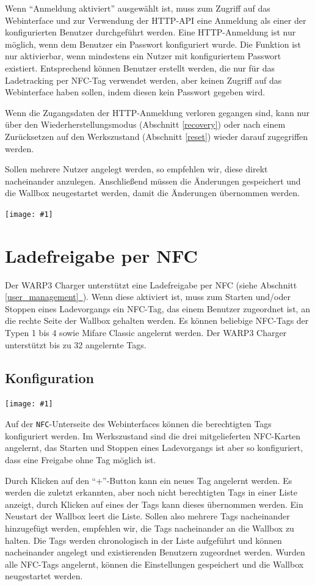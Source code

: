 \documentclass[a4paper,10pt]{article}
\newcommand{\hint}[1]{\begin{tcolorbox}[colback=boxgray,colframe=black,coltext=
white,title=Hinweis,left*=2mm,right*=2mm,boxsep=1mm,bottom=1mm,top=1mm]#1\end{tcolorbox}}
\newcommand{\gfx}[1]{\texttt{[image: \#1]}}
\newcommand*{\fullref}[1]{Abschnitt \hyperref[{#1}]{\ref*{#1}~\nameref*{#1}}}
\begin{document}
\begin{multicols*}{2}
    Wenn \enquote{Anmeldung aktiviert} ausgewählt ist, muss zum Zugriff auf das Webinterface und zur Verwendung
    der HTTP-API eine Anmeldung als einer der konfigurierten Benutzer durchgeführt werden. Eine HTTP-Anmeldung ist nur möglich, wenn
    dem Benutzer ein Passwort konfiguriert wurde. Die Funktion ist nur aktivierbar, wenn mindestens ein Nutzer mit konfiguriertem Passwort existiert. Entsprechend können Benutzer erstellt werden, die nur für das Ladetracking per NFC-Tag
    verwendet werden, aber keinen Zugriff auf das Webinterface haben sollen,
	indem diesen kein Passwort gegeben wird.
    \hint{Wenn die Zugangsdaten der HTTP-Anmeldung verloren gegangen sind, kann nur
    über den Wiederherstellungsmodus (Abschnitt \ref{recovery}) oder nach einem
    Zurücksetzen auf den Werkszustand (Abschnitt \ref{reset}) wieder darauf zugegriffen werden.}

    Sollen mehrere Nutzer angelegt werden, so empfehlen wir, diese direkt
    nacheinander anzulegen. Anschließend müssen die Änderungen gespeichert und
    die Wallbox neugestartet werden, damit die Änderungen übernommen werden.

    \gfx{./img_warp3/resized/web_users}

    \newpage
    \section{Ladefreigabe per NFC}
    \label{NFC}
    Der WARP3 Charger unterstützt eine Ladefreigabe per NFC (siehe \fullref{user_management}).
    Wenn diese aktiviert ist,
    muss zum Starten und/oder Stoppen eines Ladevorgangs ein NFC-Tag, das einem Benutzer zugeordnet ist, an die rechte Seite
    der Wallbox gehalten werden. Es können beliebige NFC-Tags der Typen 1 bis 4
    sowie Mifare Classic angelernt werden. Der WARP3 Charger unterstützt bis zu 32 angelernte Tags.

    \subsection{Konfiguration}
    \gfx{./img_warp3/resized/web_nfc}

    Auf der \texttt{NFC}-Unterseite des Webinterfaces können die berechtigten Tags konfiguriert werden.
    Im Werkszustand sind die drei mitgelieferten NFC-Karten angelernt,
    das Starten und Stoppen eines Ladevorgangs ist aber so konfiguriert, dass eine
    Freigabe ohne Tag möglich ist.

    Durch Klicken auf den \enquote{+}-Button kann ein neues Tag angelernt werden.
    Es werden die zuletzt erkannten, aber noch nicht berechtigten Tags in einer
    Liste anzeigt, durch Klicken auf eines der Tags kann dieses übernommen werden. Ein Neustart der
    Wallbox leert die Liste. Sollen also mehrere Tags nacheinander hinzugefügt
    werden, empfehlen wir, die Tags nacheinander an die Wallbox zu halten. Die
    Tags werden chronologisch in der Liste aufgeführt und können
    nacheinander angelegt und existierenden Benutzern zugeordnet
    werden. Wurden alle NFC-Tags angelernt, können die Einstellungen gespeichert und die
    Wallbox neugestartet werden.


\end{multicols*}
\end{document}
